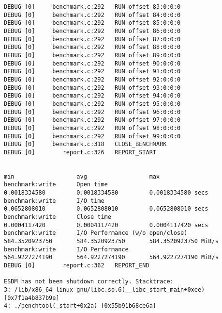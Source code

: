\begin{verbatim}
DEBUG [0]     benchmark.c:292   RUN offset 83:0:0:0
DEBUG [0]     benchmark.c:292   RUN offset 84:0:0:0
DEBUG [0]     benchmark.c:292   RUN offset 85:0:0:0
DEBUG [0]     benchmark.c:292   RUN offset 86:0:0:0
DEBUG [0]     benchmark.c:292   RUN offset 87:0:0:0
DEBUG [0]     benchmark.c:292   RUN offset 88:0:0:0
DEBUG [0]     benchmark.c:292   RUN offset 89:0:0:0
DEBUG [0]     benchmark.c:292   RUN offset 90:0:0:0
DEBUG [0]     benchmark.c:292   RUN offset 91:0:0:0
DEBUG [0]     benchmark.c:292   RUN offset 92:0:0:0
DEBUG [0]     benchmark.c:292   RUN offset 93:0:0:0
DEBUG [0]     benchmark.c:292   RUN offset 94:0:0:0
DEBUG [0]     benchmark.c:292   RUN offset 95:0:0:0
DEBUG [0]     benchmark.c:292   RUN offset 96:0:0:0
DEBUG [0]     benchmark.c:292   RUN offset 97:0:0:0
DEBUG [0]     benchmark.c:292   RUN offset 98:0:0:0
DEBUG [0]     benchmark.c:292   RUN offset 99:0:0:0
DEBUG [0]     benchmark.c:318   CLOSE_BENCHMARK
DEBUG [0]        report.c:326   REPORT_START

                                                                               min                  avg                  max
benchmark:write      Open time                                        0.0018334580         0.0018334580         0.0018334580 secs
benchmark:write      I/O time                                         0.0652808010         0.0652808010         0.0652808010 secs
benchmark:write      Close time                                       0.0004117420         0.0004117420         0.0004117420 secs
benchmark:write      I/O Performance (w/o open/close)               584.3520923750       584.3520923750       584.3520923750 MiB/s
benchmark:write      I/O Performance                                564.9227274190       564.9227274190       564.9227274190 MiB/s
DEBUG [0]        report.c:362   REPORT_END

ESDM has not been shutdown correctly. Stacktrace:
3: /lib/x86_64-linux-gnu/libc.so.6(__libc_start_main+0xee) [0x7f1a4b837b9e]
4: ./benchtool(_start+0x2a) [0x55b91b68ce6a]
\end{verbatim}

